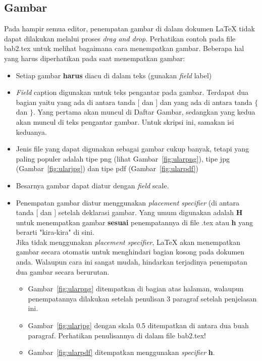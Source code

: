 \subsection{Gambar}

Pada hampir semua editor, penempatan gambar di dalam dokumen \LaTeX{} tidak dapat dilakukan melalui proses {\it drag and drop}.
Perhatikan contoh pada file bab2.tex untuk melihat bagaimana cara menempatkan gambar.
Beberapa hal yang harus diperhatikan pada saat menempatkan gambar:
\begin{itemize}
	\item Setiap gambar {\bf harus} diacu di dalam teks (gunakan {\it field} {\sc label})
	\item {\it Field} {\sc caption} digunakan untuk teks pengantar pada gambar. Terdapat dua bagian yaitu yang ada di antara tanda $[$ dan $]$ dan yang ada di antara tanda $\{$ dan $\}$. Yang pertama akan muncul di Daftar Gambar, sedangkan yang kedua akan muncul di teks pengantar gambar. Untuk skripsi ini, samakan isi keduanya.
	\item Jenis file yang dapat digunakan sebagai gambar cukup banyak, tetapi yang paling populer adalah tipe {\sc png} (lihat Gambar~\ref{fig:ularpng}), tipe {\sc jpg} (Gambar~\ref{fig:ularjpg}) dan tipe {\sc pdf} (Gambar~\ref{fig:ularpdf})
	\item Besarnya gambar dapat diatur dengan {\it field} {\sc scale}.
	\item Penempatan gambar diatur menggunakan {\it placement specifier} (di antara tanda  $[$ dan $]$ setelah deklarasi gambar.
	Yang umum digunakan adalah {\bf H} untuk menempatkan gambar {\bf sesuai} penempatannya di file .tex atau  {\bf h} yang berarti "kira-kira" di sini. \\
	Jika tidak menggunakan {\it placement specifier}, \LaTeX{} akan menempatkan gambar secara otomatis untuk menghindari bagian kosong pada dokumen anda.
	Walaupun cara ini sangat mudah, hindarkan terjadinya penempatan dua gambar secara berurutan. 	
	\begin{itemize}
		\item Gambar~\ref{fig:ularpng} ditempatkan di bagian atas halaman, walaupun penempatannya dilakukan setelah penulisan 3 paragraf setelah penjelasan ini.
		\item Gambar~\ref{fig:ularjpg} dengan skala 0.5 ditempatkan di antara dua buah paragraf. Perhatikan penulisannya di dalam file bab2.tex!
		\item Gambar~\ref{fig:ularpdf} ditempatkan menggunakan {\it specifier} {\bf h}.
	\end{itemize}
\end{itemize}
 
